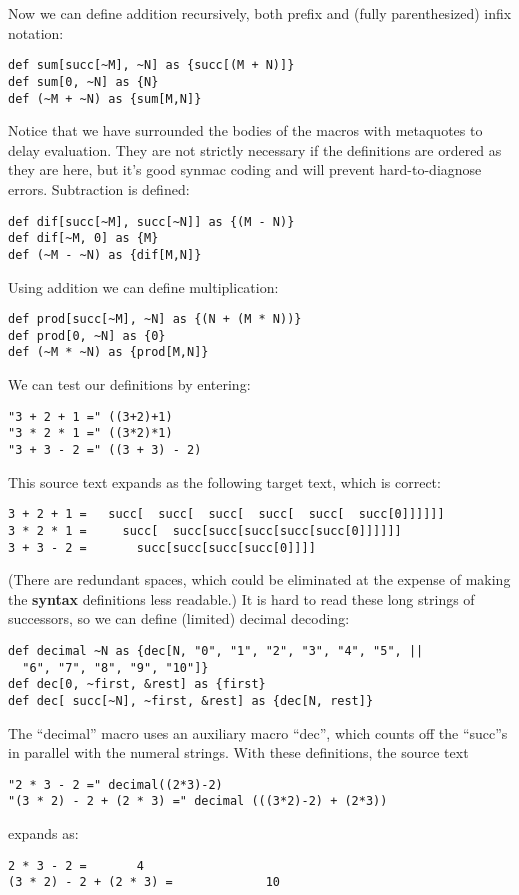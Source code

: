 \documentclass[12pt]{article}
\begin{document}
Now we can define addition recursively, both prefix and (fully parenthesized) infix notation:
\begin{lstlisting}[frame=single,language=func]
def sum[succ[~M], ~N] as {succ[(M + N)]}
def sum[0, ~N] as {N}
def (~M + ~N) as {sum[M,N]}
\end{lstlisting}
Notice that we have surrounded the bodies of the macros with metaquotes to delay evaluation.
They are not strictly necessary if the definitions are ordered as they are here, but it's good synmac coding and will prevent hard-to-diagnose errors.
Subtraction is defined:
\begin{lstlisting}[frame=single,language=func]
def dif[succ[~M], succ[~N]] as {(M - N)}
def dif[~M, 0] as {M}
def (~M - ~N) as {dif[M,N]}
\end{lstlisting}
Using addition we can define multiplication:
\begin{lstlisting}[frame=single,language=func]
def prod[succ[~M], ~N] as {(N + (M * N))}
def prod[0, ~N] as {0}
def (~M * ~N) as {prod[M,N]}
\end{lstlisting}
We can test our definitions by entering:
\begin{lstlisting}[frame=single]
"3 + 2 + 1 =" ((3+2)+1)
"3 * 2 * 1 =" ((3*2)*1)
"3 + 3 - 2 =" ((3 + 3) - 2)
\end{lstlisting}
This source text expands as the following target text, which is correct:
\begin{lstlisting}[frame=single]
3 + 2 + 1 =   succ[  succ[  succ[  succ[  succ[  succ[0]]]]]]
3 * 2 * 1 =     succ[  succ[succ[succ[succ[succ[0]]]]]]
3 + 3 - 2 =       succ[succ[succ[succ[0]]]]
\end{lstlisting}
(There are redundant spaces, which could be eliminated at the expense of making the \textbf{syntax} definitions less readable.)
It is hard to read these long strings of successors, so we can define (limited) decimal decoding:
\begin{lstlisting}[frame=single,language=func]
def decimal ~N as {dec[N, "0", "1", "2", "3", "4", "5", ||
  "6", "7", "8", "9", "10"]}
def dec[0, ~first, &rest] as {first}
def dec[ succ[~N], ~first, &rest] as {dec[N, rest]}
\end{lstlisting}
The ``decimal'' macro uses an auxiliary macro ``dec'', which counts off the ``succ''s in parallel with the numeral strings.
With these definitions, the source text
\begin{lstlisting}[frame=single]
"2 * 3 - 2 =" decimal((2*3)-2)
"(3 * 2) - 2 + (2 * 3) =" decimal (((3*2)-2) + (2*3))
\end{lstlisting}
expands as:
\begin{lstlisting}[frame=single]
2 * 3 - 2 =       4
(3 * 2) - 2 + (2 * 3) =             10
\end{lstlisting}
\end{document}
